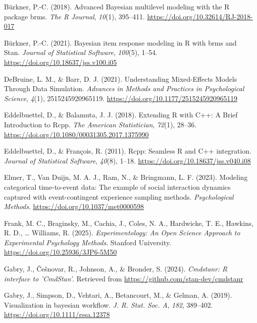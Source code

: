 \documentclass[
  english,
  man, donotrepeattitle,floatsintext]{apa6}
\newlength{\cslhangindent}
\newenvironment{CSLReferences}[2] %
 {\begin{list}{}{%
  \setlength{\itemindent}{0pt}
  \setlength{\leftmargin}{0pt}
  \setlength{\parsep}{0pt}
  \ifodd #1
   \setlength{\leftmargin}{\cslhangindent}
   \setlength{\itemindent}{-1\cslhangindent}
  \fi
  \setlength{\itemsep}{#2\baselineskip}}}
 {\end{list}}
\begin{document}
\begin{CSLReferences}{1}{0}
Bürkner, P.-C. (2018). Advanced {Bayesian} multilevel modeling with the {R} package {brms}. \emph{The R Journal}, \emph{10}(1), 395--411. \url{https://doi.org/10.32614/RJ-2018-017}

Bürkner, P.-C. (2021). Bayesian item response modeling in {R} with {brms} and {Stan}. \emph{Journal of Statistical Software}, \emph{100}(5), 1--54. \url{https://doi.org/10.18637/jss.v100.i05}

DeBruine, L. M., \& Barr, D. J. (2021). Understanding {Mixed-Effects Models Through Data Simulation}. \emph{Advances in Methods and Practices in Psychological Science}, \emph{4}(1), 2515245920965119. \url{https://doi.org/10.1177/2515245920965119}

Eddelbuettel, D., \& Balamuta, J. J. (2018). {Extending {R} with {C++}: A Brief Introduction to {Rcpp}}. \emph{The American Statistician}, \emph{72}(1), 28--36. \url{https://doi.org/10.1080/00031305.2017.1375990}

Eddelbuettel, D., \& François, R. (2011). {Rcpp}: Seamless {R} and {C++} integration. \emph{Journal of Statistical Software}, \emph{40}(8), 1--18. \url{https://doi.org/10.18637/jss.v040.i08}

Elmer, T., Van Duijn, M. A. J., Ram, N., \& Bringmann, L. F. (2023). Modeling categorical time-to-event data: {The} example of social interaction dynamics captured with event-contingent experience sampling methods. \emph{Psychological Methods}. \url{https://doi.org/10.1037/met0000598}

Frank, M. C., Braginsky, M., Cachia, J., Coles, N. A., Hardwicke, T. E., Hawkins, R. D., \ldots{} Williams, R. (2025). \emph{{Experimentology: An Open Science Approach to Experimental Psychology Methods}}. Stanford University. \url{https://doi.org/10.25936/3JP6-5M50}

Gabry, J., Češnovar, R., Johnson, A., \& Bronder, S. (2024). \emph{Cmdstanr: R interface to 'CmdStan'}. Retrieved from \url{https://github.com/stan-dev/cmdstanr}

Gabry, J., Simpson, D., Vehtari, A., Betancourt, M., \& Gelman, A. (2019). Visualization in bayesian workflow. \emph{J. R. Stat. Soc. A}, \emph{182}, 389--402. \url{https://doi.org/10.1111/rssa.12378}


\end{CSLReferences}
\end{document}
